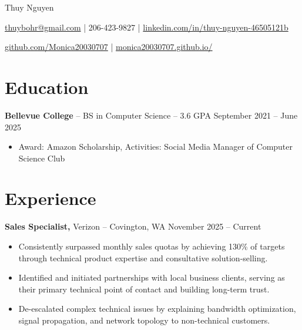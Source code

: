 \documentclass[11pt]{article}       %
\begin{document}
\centerline{\Huge Thuy Nguyen}

\vspace{5pt}

\centerline{\href{mailto:thuybohr@gmail.com}{thuybohr@gmail.com} | 206-423-9827 |
\href{https://www.linkedin.com/in/thuy-nguyen-46505121b/}{linkedin.com/in/thuy-nguyen-46505121b}}

\centerline{\href{https://github.com/Monica20030707}{github.com/Monica20030707} | 
\href{https://monica20030707.github.io/}{monica20030707.github.io/}} 

\vspace{-9pt}

\section*{Education}
\textbf{Bellevue College} -- BS in Computer Science -- 3.6 GPA \hfill September 2021 -- June 2025\\
\vspace{-9pt}
\begin{itemize}
  \item Award: Amazon Scholarship, Activities: Social Media Manager of Computer Science Club
\end{itemize}

\vspace{-18.5pt}

\section*{Experience}

\textbf{Sales Specialist,} {Verizon} -- Covington, WA \hfill November 2025 -- Current \\
\vspace{-9pt}
\begin{itemize}
  \item Consistently surpassed monthly sales quotas by achieving 130\% of targets through technical product expertise and consultative solution-selling.
  \item Identified and initiated partnerships with local business clients, serving as their primary technical point of contact and building long-term trust.
  \item De-escalated complex technical issues by explaining bandwidth optimization, signal propagation, and network topology to non-technical customers.
\end{itemize}
\end{document}
